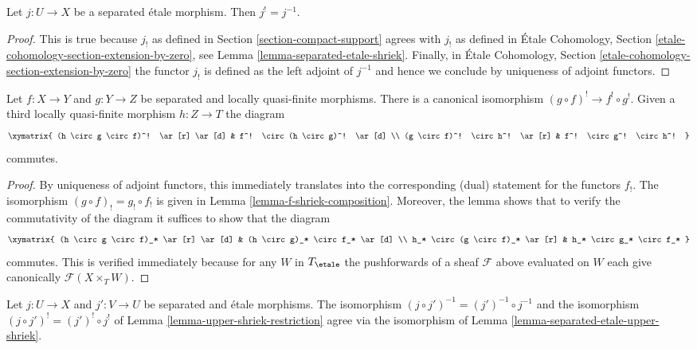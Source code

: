 \begin{lemma}
\label{lemma-separated-etale-upper-shriek}
Let $j : U \to X$ be a separated \'etale morphism. Then $j^! = j^{-1}$.
\end{lemma}

\begin{proof}
This is true because $j_!$ as defined in Section \ref{section-compact-support}
agrees with $j_!$ as defined in \'Etale Cohomology, Section
\ref{etale-cohomology-section-extension-by-zero}, see
Lemma \ref{lemma-separated-etale-shriek}. Finally, in
\'Etale Cohomology, Section \ref{etale-cohomology-section-extension-by-zero}
the functor $j_!$ is defined
as the left adjoint of $j^{-1}$ and hence we conclude by
uniqueness of adjoint functors.
\end{proof}

\begin{lemma}
\label{lemma-upper-shriek-restriction}
Let $f : X \to Y$ and $g : Y \to Z$ be separated and locally quasi-finite
morphisms. There is a canonical isomorphism $(g \circ f)^! \to f^! \circ g^!$.
Given a third locally quasi-finite morphism $h : Z \to T$
the diagram
$$
\xymatrix{
(h \circ g \circ f)^! \ar[r] \ar[d] &
f^! \circ (h \circ g)^! \ar[d] \\
(g \circ f)^! \circ h^! \ar[r] & f^! \circ g^! \circ h^!
}
$$
commutes.
\end{lemma}

\begin{proof}
By uniqueness of adjoint functors, this immediately translates
into the corresponding (dual) statement for the functors $f_!$.
The isomorphism $(g \circ f)_! = g_! \circ f_!$ is given in
Lemma \ref{lemma-f-shriek-composition}. Moreover, the lemma
shows that to verify the commutativity of the diagram it suffices
to show that the diagram
$$
\xymatrix{
(h \circ g \circ f)_* \ar[r] \ar[d] &
(h \circ g)_* \circ f_* \ar[d] \\
h_* \circ (g \circ f)_* \ar[r] & h_* \circ g_* \circ f_*
}
$$
commutes. This is verified immediately because for any $W$ in $T_\etale$
the pushforwards of a sheaf $\mathcal{F}$ above evaluated on $W$
each give canonically $\mathcal{F}(X \times_T W)$.
\end{proof}

\begin{lemma}
\label{lemma-upper-shriek-restriction-etale}
Let $j : U \to X$ and $j' : V \to U$ be separated and \'etale
morphisms. The isomorphism $(j \circ j')^{-1} = (j')^{-1} \circ j^{-1}$
and the isomorphism $(j \circ j')^! = (j')^! \circ j^!$ of
Lemma \ref{lemma-upper-shriek-restriction}
agree via the isomorphism of Lemma \ref{lemma-separated-etale-upper-shriek}.
\end{lemma}

